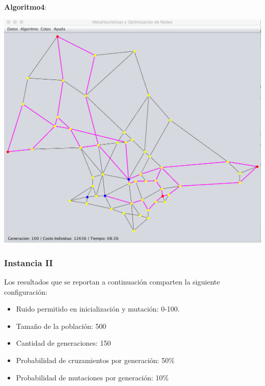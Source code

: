\documentclass{extarticle}
\begin{document}
\textbf{Algoritmo4}:
\begin{center}
	\includegraphics[scale=0.4]{img/metaheuristica/i1_s4}
\end{center}
\subsubsection{Instancia II}
Los resultados que se reportan a continuación comparten la siguiente configuración:
\begin{itemize}
	\item Ruido permitido en inicialización y mutación: 0-100.
	\item Tamaño de la población: 500
	\item Cantidad de generaciones: 150
	\item Probabilidad de cruzamientos por generación: 50\%
	\item Probabilidad de mutaciones por generación: 10\%
\end{itemize}
\end{document}

